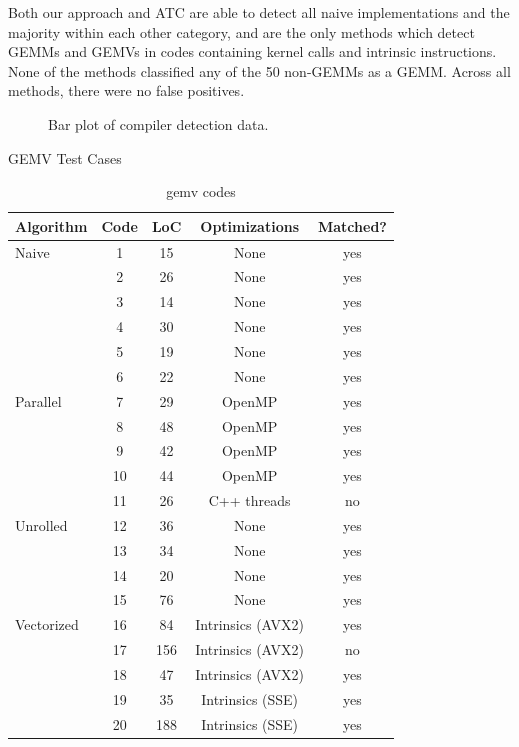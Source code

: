 \documentclass[manuscript,screen,review]{acmart}
\begin{document}
Both our approach and ATC are able to detect all naive implementations and the majority within each other category, and are the only methods which detect GEMMs and GEMVs in codes containing kernel calls and intrinsic instructions. None of the methods classified any of the 50 non-GEMMs as a GEMM. Across all methods, there were no false positives.



\begin{figure}[h!]
	\centering
	\caption{Bar plot of compiler detection data.}
	\label{fig:detection}
\end{figure}


\begin{table}[h]
	\centering
	\caption{GEMV Test Cases}
	\label{tab:gemv_test_cases}
	\begin{tabular}{|l|cccc|}
		\hline
		Algorithm & Code & LoC & Optimizations & Matched? \\ \hline
		Naive & 1 & 15 & None & yes \\ \cline{2-5}
		& 2 & 26 & None & yes \\ \cline{2-5}
		& 3 & 14 & None & yes \\ \cline{2-5}
		& 4 & 30 & None & yes \\ \cline{2-5}
		& 5 & 19 & None & yes \\ \cline{2-5}
		& 6 & 22 & None & yes \\ \hline
		Parallel & 7 & 29 & OpenMP & yes \\ \cline{2-5}
		& 8 & 48 & OpenMP & yes \\ \cline{2-5}
		& 9 & 42 & OpenMP & yes \\ \cline{2-5}
		& 10 & 44 & OpenMP & yes \\ \cline{2-5}
		& 11 & 26 & C++ threads & no \\ \hline
		Unrolled & 12 & 36 & None & yes \\ \cline{2-5}
		& 13 & 34 & None & yes \\ \cline{2-5}
		& 14 & 20 & None & yes \\ \cline{2-5}
		& 15 & 76 & None & yes \\ \hline
		Vectorized & 16 & 84 & Intrinsics (AVX2) & yes \\ \cline{2-5}
		& 17 & 156 & Intrinsics (AVX2) & no \\ \cline{2-5}
		& 18 & 47 & Intrinsics (AVX2) & yes \\ \cline{2-5}
		& 19 & 35 & Intrinsics (SSE) & yes \\ \cline{2-5}
		& 20 & 188 & Intrinsics (SSE) & yes \\ \hline
	\end{tabular}
    \caption{gemv codes}
    \label{gemv-codes}
\end{table}
\end{document}
